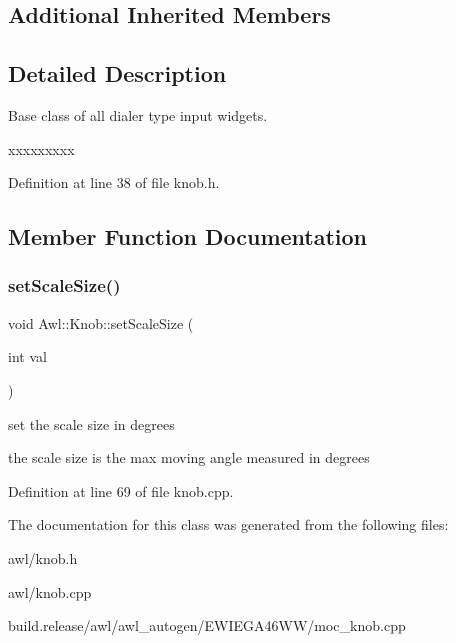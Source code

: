 \subsection*{Additional Inherited Members}


\subsection{Detailed Description}
Base class of all dialer type input widgets. 

xxxxxxxxx 

Definition at line 38 of file knob.\+h.



\subsection{Member Function Documentation}
\mbox{\label{class_awl_1_1_knob_aa8d7f92cc7ebfb1a2026e9cf5e47bd6d}} 
\subsubsection{\texorpdfstring{set\+Scale\+Size()}{setScaleSize()}}
{\footnotesize\ttfamily void Awl\+::\+Knob\+::set\+Scale\+Size (\begin{DoxyParamCaption}\item[{int}]{val }\end{DoxyParamCaption})}



set the scale size in degrees 

the scale size is the max moving angle measured in degrees 

Definition at line 69 of file knob.\+cpp.



The documentation for this class was generated from the following files\+:\begin{DoxyCompactItemize}
\item 
awl/knob.\+h\item 
awl/knob.\+cpp\item 
build.\+release/awl/awl\+\_\+autogen/\+E\+W\+I\+E\+G\+A46\+W\+W/moc\+\_\+knob.\+cpp\end{DoxyCompactItemize}
